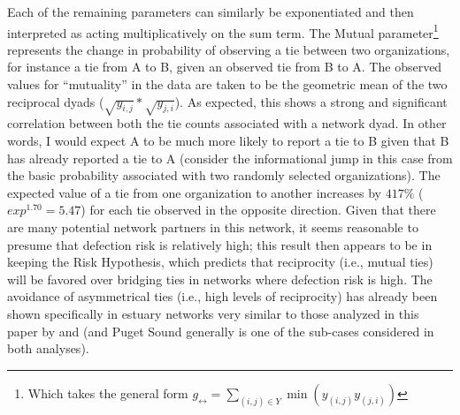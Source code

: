 \documentclass[12pt,a4paper,titlepage]{article}
\begin{document}
Each of the remaining parameters can similarly be exponentiated and then interpreted as acting multiplicatively on the sum term. The Mutual parameter\footnote{Which takes the general form $g_{\leftrightarrow} = \sum_{(i,j) \in Y} \min{( y_{(i,j)} y_{(j,i)})}$} represents the change in probability of observing a tie between two organizations, for instance a tie from A to B, given an observed tie from B to A. The observed values for “mutuality” in the data are taken to be the geometric mean of the two reciprocal dyads ($\sqrt{y_{i,j}} * \sqrt{y_{j,i}}$). As expected, this shows a strong and significant correlation between both the tie counts associated with a network dyad. In other words, I would expect A to be much more likely to report a tie to B given that B has already reported a tie to A (consider the informational jump in this case from the basic probability associated with two randomly selected organizations). The expected value of a tie from one organization to another increases by $417\%$ ($exp^{1.70} = 5.47$) for each tie observed in the opposite direction. Given that there are many potential network partners in this network, it seems reasonable to presume that defection risk is relatively high; this result then appears to be in keeping the \textcite{berardo2010} Risk Hypothesis, which predicts that reciprocity (i.e., mutual ties) will be favored over bridging ties in networks where defection risk is high. The avoidance of asymmetrical ties (i.e., high levels of reciprocity) has already been shown specifically in estuary networks very similar to those analyzed in this paper by \textcite{berardo2010} and \textcite{desmarais2012} (and Puget Sound generally is one of the sub-cases considered in both analyses).  
\end{document}
